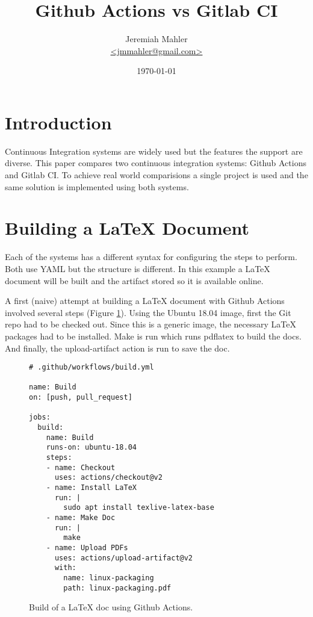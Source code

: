 \documentclass{article}
\begin{document}
\title{Github Actions vs Gitlab CI}
\author{
	\Large{Jeremiah Mahler}\\
	\small{\href{mailto:jmmahler@gmail.com}{\textless jmmahler@gmail.com\textgreater}}
}
\date{\today}
\maketitle

\thispagestyle{empty}
\tableofcontents

\section{Introduction}

Continuous Integration systems are widely used but the features
the support are diverse.
This paper compares two continuous integration systems: Github
Actions\autocite{github-actions} and Gitlab CI\autocite{gitlab-ci}.
To achieve real world comparisions a single project is used and
the same solution is implemented using both systems.

\section{Building a LaTeX Document}

Each of the systems has a different syntax for configuring the
steps to perform.
Both use YAML but the structure is different.
In this example a LaTeX document will be built and the artifact
stored so it is available online.

A first (naive) attempt at building a LaTeX document with Github Actions
involved several steps
(Figure
\ref{fig:github-actions-build})\autocite{github-jmahler-resume-build.yml}\autocite{github-resume-build-91697435}.
Using the Ubuntu 18.04 image, first the Git repo had to be checked out.
Since this is a generic image, the necessary LaTeX packages had
to be installed.
Make is run which runs pdflatex to build the docs.
And finally, the upload-artifact action is run to save the doc.

\begin{figure}[!ht]
\begin{lstlisting}
# .github/workflows/build.yml

name: Build
on: [push, pull_request]

jobs:
  build:
    name: Build
    runs-on: ubuntu-18.04
    steps:
    - name: Checkout
      uses: actions/checkout@v2
    - name: Install LaTeX
      run: |
        sudo apt install texlive-latex-base
    - name: Make Doc
      run: |
        make
    - name: Upload PDFs
      uses: actions/upload-artifact@v2
      with:
        name: linux-packaging
        path: linux-packaging.pdf
\end{lstlisting}
\label{fig:github-actions-build}
\caption{Build of a LaTeX doc using Github Actions.}
\end{figure}
\end{document}
